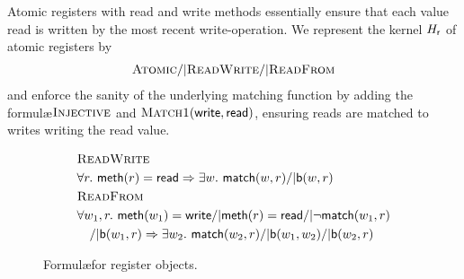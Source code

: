 \begin{example}

  Atomic registers with {\sf read} and {\sf write} methods essentially ensure
  that each value read is written by the most recent {\sc write}-operation.
  We represent the kernel $H_{\sf r}$ of atomic registers by
  \begin{align*}
    \textsc{Atomic} /| \textsc{ReadWrite} /| \textsc{ReadFrom}
  \end{align*}
  and enforce the sanity of the underlying matching function by adding the
  formul\ae $\textsc{Injective}$ and $\textsc{Match1}({\sf write},{\sf read})$,
  ensuring reads are matched to writes writing the read value.

\end{example}

\begin{figure}
  \footnotesize
  \begin{align*}
    & \textsc{ReadWrite} \\
    & \forall r.\ {\sf meth}(r) = {\sf read} => \exists w.\ {\sf match}(w,r) /| {\sf b}(w,r)
    \\
    & \textsc{ReadFrom} \\
    & \forall w_1, r.\ {\sf meth}(w_1) = {\sf write} /| {\sf meth}(r) = {\sf read} /| \neg {\sf match}(w_1,r) \\
    & \quad /| {\sf b}(w_1,r) => \exists w_2.\ {\sf match}(w_2,r) /| {\sf b}(w_1,w_2) /| {\sf b}(w_2,r)
  \end{align*}
  \caption{Formul\ae for register objects.}
  \label{fig:formulas:register}
\end{figure}

